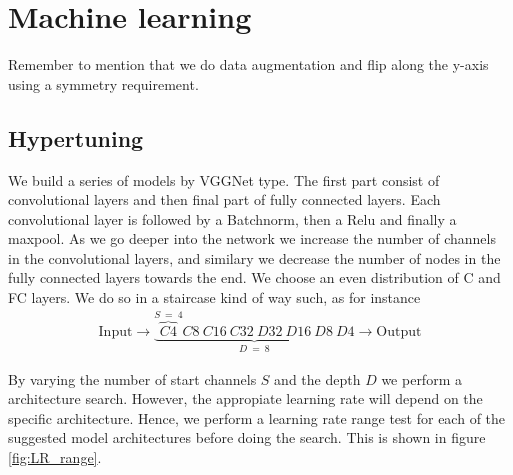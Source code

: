 \section{Machine learning}

Remember to mention that we do data augmentation and flip along the y-axis using a symmetry requirement.

\subsection{Hypertuning}

We build a series of models by VGGNet type. The first part consist of convolutional layers and then final part of fully connected layers. Each convolutional layer is followed by a Batchnorm, then a Relu and finally a maxpool. As we go deeper into the network we increase the number of channels in the convolutional layers, and similary we decrease the number of nodes in the fully connected layers towards the end. We choose an even distribution of C and FC layers. We do so in a staircase kind of way such, as for instance 
\begin{align*}
  \text{Input} \to \underbrace{\overbrace{C4}^{S \ = \ 4}C8 \ C16 \ C32 \ D32 \ D16 \ D8 \ D4}_{D \ = \ 8} \to \text{Output}
\end{align*} 

By varying the number of start channels $S$ and the depth $D$ we perform a architecture search. However, the appropiate learning rate will depend on the specific architecture. Hence, we perform a learning rate range test for each of the suggested model architectures before doing the search. This is shown in figure \cref{fig:LR_range}.

